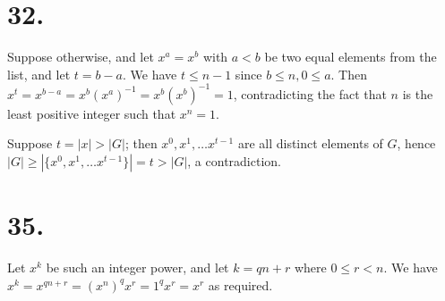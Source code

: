 \documentclass{article}
\begin{document}
\section*{32.}

Suppose otherwise, and let $x^a = x^b$ with $a < b$ be two equal elements from the list, and let $t = b-a$. We have $t \le n-1$ since $b \le n, 0 \le a$. Then $x^t = x^{b-a} = x^b (x^a)^{-1} = x^b (x^b)^{-1} = 1$, contradicting the fact that $n$ is the least positive integer such that $x^n = 1$.

Suppose $t = |x| > |G|$; then $x^0, x^1, \ldots x^{t-1}$ are all distinct elements of $G$, hence $|G| \ge |\{x^0, x^1, \ldots x^{t-1}\}| = t > |G|$, a contradiction.

\section*{35.}

Let $x^k$ be such an integer power, and let $k = qn + r$ where $0 \le r < n$. We have $x^k = x^{qn+r} = (x^n)^q x^r = 1^q x^r = x^r$ as required.
\end{document}
